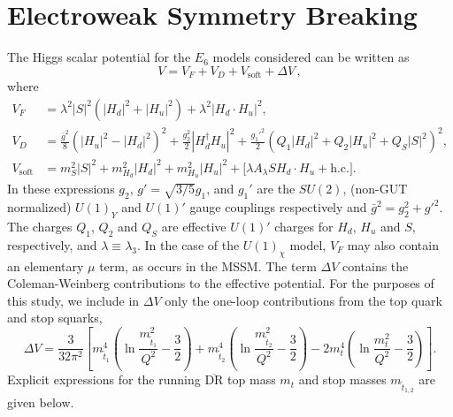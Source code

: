 \documentclass[preprint,amsmath,amssymb,aps,superscriptaddress,prd,
showpacs,floatfix,nofootinbib]{revtex4-1}
\begin{document}
\section{\label{sec:ewsb}Electroweak Symmetry
Breaking}

The Higgs scalar potential for the $E_6$ models considered can be written as
\cite{King:2005jy}
\begin{equation} \label{eq:E6VeffOneLoop}
V = V_F + V_D + V_{\textrm{soft}} + \Delta V \, ,
\end{equation}
where
\begin{align}
V_F &= \lambda^2 |S|^2 (|H_d|^2 + |H_u|^2) + \lambda^2 |H_d \cdot H_u|^2 ,
\label{eq:E6VFterms} \\
V_D &= \frac{\bar{g}^2}{8} \left (|H_u|^2 - |H_d|^2 \right )^2 +
\frac{g_2^2}{2} |H_d^\dagger H_u|^2 + \frac{g_1'^2}{2} (Q_1 |H_d|^2 +
Q_2 |H_u|^2 + Q_S |S|^2)^2 , \label{eq:E6VDterms} \\
V_{\textrm{soft}} &= m_S^2 |S|^2 + m_{H_d}^2 |H_d|^2 + m_{H_u}^2 |H_u|^2 +
\Big [\lambda A_\lambda S H_d \cdot H_u + \textrm{h.c.} \Big ] .
\label{eq:E6Vsoft}
\end{align}
In these expressions $g_2$, $g' = \sqrt{3/5} g_1$, and $g_1'$ are the
$SU(2)$, (non-GUT normalized) $U(1)_Y$ and $U(1)'$ gauge couplings
respectively and $\bar{g}^2 = g_2^2 + g'^2$.  The charges $Q_1$, $Q_2$ and
$Q_S$ are effective $U(1)'$ charges for $H_d$, $H_u$ and $S$, respectively,
and $\lambda \equiv \lambda_3$.  In the case of the $U(1)_\chi$ model, $V_F$
may also contain an elementary $\mu$ term, as occurs in the MSSM.  The term
$\Delta V$ contains the Coleman-Weinberg contributions to the effective
potential.  For the purposes of this study, we include in $\Delta V$ only the
one-loop contributions from the top quark and stop squarks,
\begin{equation}
\Delta V = \frac{3}{32\pi^2} \left [ m_{\tilde{t}_1}^4 \left ( \ln
\frac{m_{\tilde{t}_1}^2}{Q^2} - \frac{3}{2} \right ) + m_{\tilde{t}_2}^4
\left ( \ln \frac{m_{\tilde{t}_2}^2}{Q^2} - \frac{3}{2} \right ) - 2m_t^4
\left ( \ln \frac{m_t^2}{Q^2} - \frac{3}{2} \right ) \right ] .
\label{Eq:DeltaV}
\end{equation}
Explicit expressions for the running $\overline{\textrm{DR}}$ top mass $m_t$
and stop masses $m_{\tilde{t}_{1,2}}$ are given below.
\end{document}
